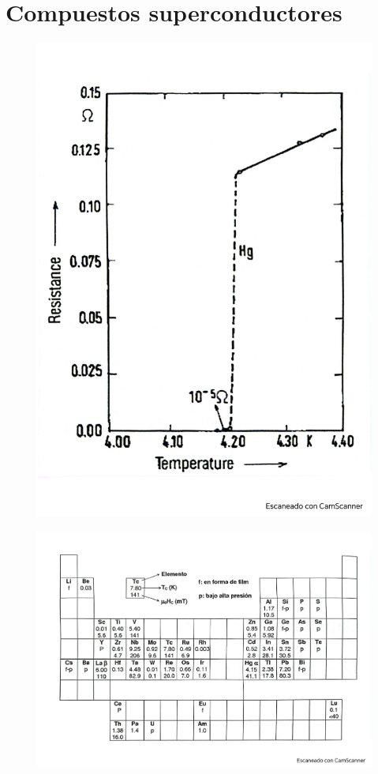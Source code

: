 \section{Compuestos superconductores}
\begin{figure}[h!] \centering
	\includegraphics[scale=0.5]{Cuerpo/Ch_11/Fotos libro 1.pdf}
	\caption{}
	\label{Fig:11-01}
\end{figure}
\begin{figure}[h!] \centering
	\includegraphics[scale=0.5]{Cuerpo/Ch_11/Fotos libro 2.pdf}
	\caption{}
	\label{Fig:11-02}
\end{figure}

